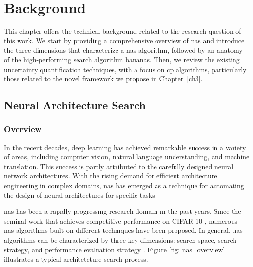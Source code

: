 \chapter{Background}
This chapter offers the technical background related to the research question of this work. We start by providing a comprehensive overview of \gls{nas} and introduce the three dimensions that characterize a \gls{nas} algorithm, followed by an anatomy of the high-performing search algorithm \gls{bananas}. Then, we review the existing uncertainty quantification techniques, with a focus on \gls{cp} algorithms, particularly those related to the novel framework we propose in Chapter~\ref{ch3}.

\section{Neural Architecture Search}
\subsection{Overview}
\label{sec: nas}
In the recent decades, deep learning has achieved remarkable success in a variety of areas, including computer vision, natural language understanding, and machine translation. This success is partly attributed to the carefully designed neural network architectures. With the rising demand for efficient architecture engineering in complex domains, \gls{nas} has emerged as a technique for automating the design of neural architectures for specific tasks.
 
\gls{nas} has been a rapidly progressing research domain in the past years. Since the seminal work that achieves competitive performance on CIFAR-10 \cite{zoph2017neural}, numerous \gls{nas} algorithms built on different techniques have been proposed. In general, \gls{nas} algorithms can be characterized by three key dimensions: search space, search strategy, and performance evaluation strategy \cite{elsken2019neural, white2023survey, wistuba2019survey}. Figure \ref{fig: nas_overview} illustrates a typical architetcture search process.


